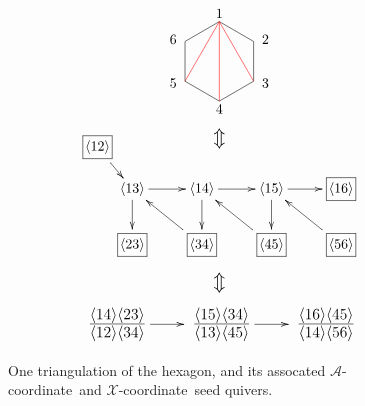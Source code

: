\documentclass[11pt]{article}
\def\ket#1{\langle #1 \rangle}
\def\xcoord{$\mathcal{X}$-coordinate}
\def\acoord{$\mathcal{A}$-coordinate}
\def\drawLabeledHexagon{
\coordinate (P1) at (90:1);
\coordinate (P2) at (30:1);
\coordinate (P3) at (330:1);
\coordinate (P4) at (270:1);
\coordinate (P5) at (210:1);
\coordinate (P6) at (150:1);
\draw (P1) -- (P2) -- (P3) -- (P4) -- (P5) -- (P6) -- cycle;
\draw (0,1.2) node {1};
\draw (30:1.1) node[anchor=west] {2};
\draw (330:1.1) node[anchor=west] {3};
\draw (270:1.2) node {4};
\draw (210:1.1) node[anchor=east] {5};
\draw (150:1.1) node[anchor=east] {6};
}
\begin{document}
\begin{figure}
\begin{equation*}
\begin{gathered}
\begin{tikzpicture}
	\drawLabeledHexagon
  	\draw[color=red] (P1) -- (P3);
  	\draw[color=red] (P1) -- (P4);
  	\draw[color=red] (P1) -- (P5);
\end{tikzpicture}
\\ \scalebox{1.4}{$\Updownarrow$}
\\ \ \vspace{-1.1cm} \ \\
\begin{xy} 0;<1pt,0pt>:<0pt,-1pt>::
	(25,30) *+{\langle 13\rangle} ="0",
	(75,30) *+{\langle 14\rangle} ="1",
	(125,30) *+{\langle 15\rangle} ="2",
	(0,0) *+{\framebox[5ex]{$\langle 12\rangle$}} ="3",
	(25,70) *+{\framebox[5ex]{$\langle 23\rangle$}} ="4",
	(75,70) *+{\framebox[5ex]{$\langle 34\rangle$}} ="5",
	(125,70) *+{\framebox[5ex]{$\langle 45\rangle$}} ="6",
	(175,70) *+{\framebox[5ex]{$\langle 56\rangle$}} ="7",
	(175,30) *+{\framebox[5ex]{$\langle 16\rangle$}} ="8",
	"0", {\ar"1"},
	"1", {\ar"2"},
	"3", {\ar"0"},
	"0", {\ar"4"},
	"5", {\ar"0"},
	"1", {\ar"5"},
	"6", {\ar"1"},
	"2", {\ar"6"},
	"7", {\ar"2"},
	"2", {\ar"8"},
\end{xy} \\ 
\ \vspace{-.4cm} \ \\ 
\scalebox{1.4}{$\Updownarrow$} \\ 
\ \vspace{-.4cm} \ \\ 
\begin{xy} 0;<1pt,0pt>:<0pt,-1pt>::
	(0,0) *+\txt{\fontsize{16pt}{16pt} $\frac{\ket{14}\ket{23}}{\ket{12}\ket{34}}$} ="0",
	(75,0) *+\txt{\fontsize{16pt}{16pt} $\frac{\ket{15}\ket{34}}{\ket{13}\ket{45}}$} ="1",
	(150,0) *+\txt{\fontsize{16pt}{16pt} $\frac{\ket{16}\ket{45}}{\ket{14}\ket{56}}$} ="2",
	"0", {\ar"1"},
	"1", {\ar"2"},
\end{xy}
\end{gathered} 
\end{equation*}
\caption{One triangulation of the hexagon, and its assocated \acoord\ and \xcoord\ seed quivers.}
\label{eq:gr26-seed}
\end{figure}
\end{document}
